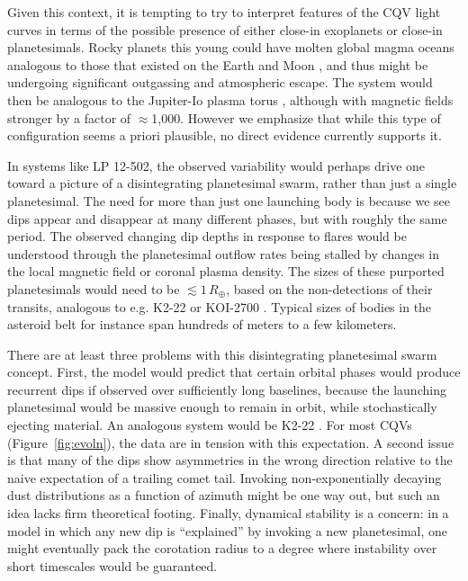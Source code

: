 \documentclass[11pt,twocolumn,tighten]{aastex63}
\begin{document}
Given this context, it is tempting to try to interpret features of the
CQV light curves in terms of the possible presence of either close-in
exoplanets or close-in planetesimals.  Rocky planets this young could
have molten global magma oceans analogous to those that existed on the
Earth and Moon \citep[see][]{2022arXiv220310023L}, and thus might be
undergoing significant outgassing and atmospheric escape.  The system
would then be analogous to the Jupiter-Io plasma torus
\citep[e.g.][]{1980JGR....85.1171N}, although with magnetic fields
stronger by a factor of $\approx$1{,}000.  However we emphasize that
while this type of configuration seems a priori plausible, no
direct evidence currently supports it.

In systems like LP 12-502, the observed variability would perhaps
drive one toward a picture of a disintegrating planetesimal swarm,
rather than just a single planetesimal.  The need for more than just
one launching body is because we see dips appear and disappear at many
different phases, but with roughly the same period.  The observed
changing dip depths in response to flares would be understood through
the planetesimal outflow rates being stalled by changes in the local
magnetic field or coronal plasma density.  The sizes of these
purported planetesimals would need to be $\lesssim 1$\,$R_\oplus$,
based on the non-detections of their transits, analogous to e.g.
K2-22 \citep{2015ApJ...812..112S} or KOI-2700
\citep{2014ApJ...784...40R}.  Typical sizes of bodies in the asteroid
belt for instance span hundreds of meters to a few kilometers.

There are at least three problems with this disintegrating
planetesimal swarm concept.  First, the model would predict that
certain orbital phases would produce recurrent dips if observed over
sufficiently long baselines, because the launching planetesimal would
be massive enough to remain in orbit, while stochastically ejecting
material.  An analogous system would be K2-22
\citep{2015ApJ...812..112S}.  For most CQVs (Figure~\ref{fig:evoln}),
the data are in tension with this expectation.  A second issue is that
many of the dips show asymmetries in the wrong direction relative to
the naive expectation of a trailing comet tail.  Invoking
non-exponentially decaying dust distributions as a function of azimuth
might be one way out, but such an idea lacks firm theoretical footing.
Finally, dynamical stability is a concern: in a model in which any new
dip is ``explained'' by invoking a new planetesimal, one might
eventually pack the corotation radius to a degree where instability
over short timescales would be guaranteed.
\end{document}
